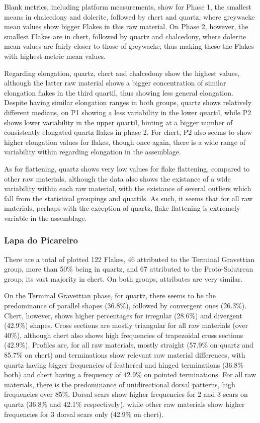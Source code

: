 \documentclass[12pt,twoside]{reedthesis}
\begin{document}
Blank metrics, including platform measurements, show for Phase 1, the smallest means in chalcedony and dolerite, followed by chert and quartz, where greywacke mean values show bigger Flakes in this raw material. On Phase 2, however, the smallest Flakes are in chert, followed by quartz and chalcedony, where dolerite mean values are fairly closer to those of greywacke, thus making these the Flakes with highest metric mean values.

Regarding elongation, quartz, chert and chalcedony show the highest values, although the latter raw material shows a bigger concentration of similar elongation flakes in the third quartil, thus showing less general elongation. Despite having similar elongation ranges in both groups, quartz shows relatively different medians, on P1 showing a less variability in the lower quartil, while P2 shows lower variability in the upper quartil, hinting at a bigger number of consistently elongated quartz flakes in phase 2. For chert, P2 also seems to show higher elongation values for flakes, though once again, there is a wide range of variability within regarding elongation in the assemblage.

As for flattening, quartz shows very low values for flake flattening, compared to other raw materials, although the data also shows the existance of a wide variability within each raw material, with the existance of several outliers which fall from the statistical groupings and quartils. As such, it seems that for all raw materials, perhaps with the exception of quartz, flake flattening is extremely variable in the assemblage.

\hypertarget{lapa-do-picareiro-3}{%
\subsubsection{Lapa do Picareiro}\label{lapa-do-picareiro-3}}

There are a total of plotted 122 Flakes, 46 attributed to the Terminal Gravettian group, more than 50\% being in quartz, and 67 attributed to the Proto-Solutrean group, its vast majority in chert. On both groups, attributes are very similar.

On the Terminal Gravettian phase, for quartz, there seems to be the predominance of parallel shapes (36.8\%), followed by convergent ones (26.3\%). Chert, however, shows higher percentages for irregular (28.6\%) and divergent (42.9\%) shapes. Cross sections are mostly triangular for all raw materials (over 40\%), although chert also shows high frequencies of trapezoidal cross sections (42.9\%). Profiles are, for all raw materials, mostly straight (57.9\% on quartz and 85.7\% on chert) and terminations show relevant raw material differences, with quartz having bigger frequencies of feathered and hinged terminations (36.8\% both) and chert having a frequency of 42.9\% on pointed terminations. For all raw materials, there is the predominance of unidirectional dorsal patterns, high frequencies over 85\%. Dorsal scars show higher frequencies for 2 and 3 scars on quartz (36.8\% and 42.1\% respectively), while other raw materials show higher frequencies for 3 dorsal scars only (42.9\% on chert).
\end{document}
